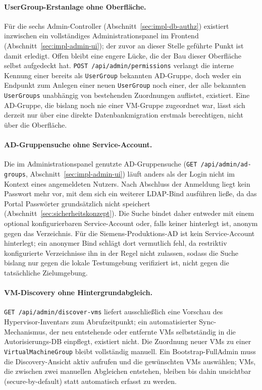 \documentclass[12pt,a4paper]{article}
\begin{document}
\paragraph{UserGroup-Erstanlage ohne Oberfläche.} Für die sechs Admin-Controller (Abschnitt~\ref{sec:impl-db-authz}) existiert inzwischen ein vollständiges Administrationspanel im Frontend (Abschnitt~\ref{sec:impl-admin-ui}); der zuvor an dieser Stelle geführte Punkt ist damit erledigt. Offen bleibt eine engere Lücke, die der Bau dieser Oberfläche selbst aufgedeckt hat. \texttt{POST~/api/admin/permissions} verlangt die interne Kennung einer bereits als \texttt{UserGroup} bekannten AD-Gruppe, doch weder ein Endpunkt zum Anlegen einer neuen \texttt{UserGroup} noch einer, der alle bekannten \texttt{UserGroups} unabhängig von bestehenden Zuordnungen auflistet, existiert. Eine AD-Gruppe, die bislang noch nie einer VM-Gruppe zugeordnet war, lässt sich derzeit nur über eine direkte Datenbankmigration erstmals berechtigen, nicht über die Oberfläche.

\paragraph{AD-Gruppensuche ohne Service-Account.} Die im Administrationspanel genutzte AD-Gruppensuche (\texttt{GET~/api/admin/ad-groups}, Abschnitt~\ref{sec:impl-admin-ui}) läuft anders als der Login nicht im Kontext eines angemeldeten Nutzers. Nach Abschluss der Anmeldung liegt kein Passwort mehr vor, mit dem sich ein weiterer LDAP-Bind ausführen ließe, da das Portal Passwörter grundsätzlich nicht speichert (Abschnitt~\ref{sec:sicherheitskonzept}). Die Suche bindet daher entweder mit einem optional konfigurierbaren Service-Account oder, falls keiner hinterlegt ist, anonym gegen das Verzeichnis. Für die Siemens-Produktions-AD ist kein Service-Account hinterlegt; ein anonymer Bind schlägt dort vermutlich fehl, da restriktiv konfigurierte Verzeichnisse ihn in der Regel nicht zulassen, sodass die Suche bislang nur gegen die lokale Testumgebung verifiziert ist, nicht gegen die tatsächliche Zielumgebung.

\paragraph{VM-Discovery ohne Hintergrundabgleich.} \texttt{GET~/api/admin/discover-vms} liefert ausschließlich eine Vorschau des Hypervisor-Inventars zum Abrufzeitpunkt; ein automatisierter Sync-Mechanismus, der neu entstehende oder entfernte VMs selbstständig in die Autorisierungs-DB einpflegt, existiert nicht. Die Zuordnung neuer VMs zu einer \texttt{VirtualMachineGroup} bleibt vollständig manuell. Ein Bootstrap-FullAdmin muss die Discovery-Ansicht aktiv aufrufen und die gewünschten VMs auswählen; VMs, die zwischen zwei manuellen Abgleichen entstehen, bleiben bis dahin unsichtbar (secure-by-default) statt automatisch erfasst zu werden.
\end{document}
